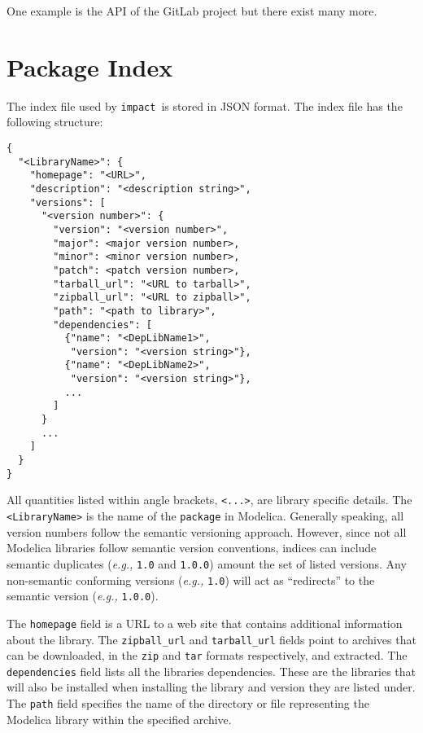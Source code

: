 \documentclass[11pt,a4paper,twocolumn]{article}
\newcommand{\impact}{\texttt{impact}} %
\newcommand{\code}[1]{\texttt{#1}} %
\begin{document}
One example is the API of the GitLab project\cite{gl-api} but there exist
many more.


\section{Package Index}
\label{sec:index}



The index file used by \impact\ is stored in JSON format.  The index file
has the following structure:

{\footnotesize
\begin{verbatim}
{
  "<LibraryName>": {
    "homepage": "<URL>",
    "description": "<description string>",
    "versions": [
      "<version number>": {
        "version": "<version number>",
        "major": <major version number>,
        "minor": <minor version number>,
        "patch": <patch version number>,
        "tarball_url": "<URL to tarball>",
        "zipball_url": "<URL to zipball>",
        "path": "<path to library>",
        "dependencies": [
          {"name": "<DepLibName1>",
           "version": "<version string>"},
          {"name": "<DepLibName2>",
           "version": "<version string>"},
          ...
        ]
      }
      ...
    ]
  }
}
\end{verbatim}
}

All quantities listed within angle brackets, \code{<...>}, are library
specific details.  The \code{<LibraryName>} is the name of the
\code{package} in Modelica.  Generally speaking, all version numbers
follow the semantic versioning approach.  However, since not all
Modelica libraries follow semantic version conventions, indices can
include semantic duplicates (\textit{e.g.,} \code{1.0} and
\code{1.0.0}) amount the set of listed versions.  Any non-semantic
conforming versions (\textit{e.g.,} \code{1.0}) will act as
``redirects'' to the semantic version (\textit{e.g.,} \code{1.0.0}).

The \code{homepage} field is a URL to a web site that contains
additional information about the library.  The \code{zipball\_url} and
\code{tarball\_url} fields point to archives that can be downloaded,
in the \code{zip} and \code{tar} formats respectively, and extracted.
The \code{dependencies} field lists all the libraries dependencies.
These are the libraries that will also be installed when installing
the library and version they are listed under.  The \code{path} field
specifies the name of the directory or file representing the Modelica
library within the specified archive.
\end{document}
